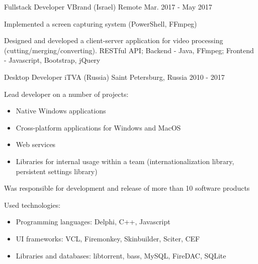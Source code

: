 \begin{cventries}
  \cventry
    {Fullstack Developer} %
    {VBrand (Israel)} %
    {Remote} %
    {Mar. 2017 - May 2017} %
    {
      \begin{cvitems} %
        \item Implemented a screen capturing system (PowerShell, FFmpeg)
		\item Designed and developed a client-server application for video processing (cutting/merging/converting). RESTful API; Backend - Java, FFmpeg; Frontend - Javascript, Bootstrap, jQuery
      \end{cvitems}
    }

  \cventry
  {Desktop Developer} %
  {iTVA (Russia)} %
  {Saint Petersburg, Russia} %
  {2010 - 2017} %
  {
    \begin{cvitems} %
      \item Lead developer on a number of projects:
      \begin{itemize}[label={•},leftmargin=10pt] %
        \item Native Windows applications
        \item Cross-platform applications for Windows and MacOS
        \item Web services
        \item Libraries for internal usage within a team (internationalization library, persistent settings library)
      \end{itemize}
      \item Was responsible for development and release of more than 10 software products
      \item Used technologies:
      \begin{itemize}[label={•},leftmargin=10pt] %
        \item Programming languages: Delphi, C++, Javascript
        \item UI frameworks: VCL, Firemonkey, Skinbuilder, Sciter, CEF
        \item Libraries and databases: libtorrent, bass, MySQL, FireDAC, SQLite
      \end{itemize}
    \end{cvitems}
  }

\end{cventries}
